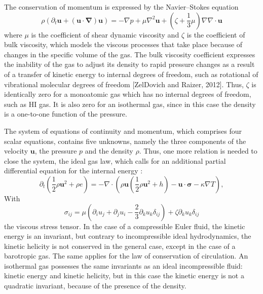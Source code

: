 The conservation of momentum is expressed by the Navier–Stokes equation
\begin{equation}
    \rho(\partial_t\mathbf{u}+(\mathbf{u}\cdot\boldsymbol{\nabla})\mathbf{u})=-\nabla p+\mu\nabla^2\mathbf{u}+\left(\zeta+\frac{1}{3}\mu\right)\nabla\nabla\cdot\mathbf{u}
\end{equation}
where $\mu$ is the coefficient of shear dynamic viscosity and $\zeta$ is the coefficient of bulk viscosity, which models the viscous processes that take place because of changes in the specific volume of the gas. The bulk viscosity coefficient expresses the inability of the gas to adjust its density to rapid pressure changes as a result of a transfer of kinetic energy to internal degrees of freedom, such as rotational of vibrational molecular degrees of freedom [ZelDovich and Raizer, 2012]. Thus, $\zeta$ is identically zero for a monoatomic gas which has no internal degrees of freedom, such as HI gas. It is also zero for an isothermal gas, since in this case the density is a one-to-one function of the pressure.

The system of equations of continuity and momentum, which comprises four scalar equations,
contains five unknowns, namely the three components of the velocity $\mathbf{u}$, the pressure $p$ and the density $\rho$. Thus, one more relation is needed to close the system, the ideal gas law, which calls for an additional partial differential equation for the internal energy :
\begin{equation}
    \partial_t\left(\frac{1}{2}\rho\mathbf{u}^2+\rho e\right)=-\nabla\cdot\left(\rho\mathbf{u}\left(\frac{1}{2}\rho\mathbf{u}^2+h\right)-\mathbf{u}\cdot\boldsymbol{\sigma}-\kappa\nabla T\right),
\end{equation}
With 
\begin{equation}
    \sigma_{ij}=\mu\left(\partial_iu_j+\partial_ju_i-\frac{2}{3}\partial_ku_k\delta_{ij}\right)+\zeta\partial_ku_k\delta_{ij}
\end{equation}
the viscous stress tensor. In the case of a compressible Euler fluid, the kinetic energy is an invariant, but contrary to incompressible ideal hydrodynamics, the kinetic helicity is not conserved in the general case, except in the case of a barotropic gas. The same applies for the law of conservation of circulation. An isothermal gas possesses the same invariants as  an ideal incompressible fluid: kinetic energy and kinetic helicity, but in this case the kinetic energy is not a quadratic invariant, because of the presence of the density.

